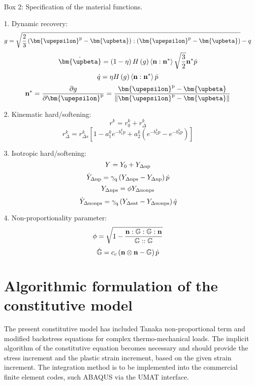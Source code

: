 \begin{framed}
\label{Box:1}
Box 2: Specification of the material functions.

1. Dynamic recovery:
\[g = \sqrt {\frac{2}{3}\left( {{{\bm{\upepsilon }}^{\rm{p}}} - {\bm{\upbeta}}} \right):\left( {{{\bm{\upepsilon }}^{\rm{p}}} - {\bm{\upbeta}}} \right)}  - q\]
\[{\dot{\bm{\upbeta}}}  = \left( {1 - \eta } \right)H\left( g \right)\left\langle {{\bf{n}}:{{\bf{n}}^*}} \right\rangle \sqrt {\frac{3}{2}} {{\bf{n}}^*}\dot p\]
\[\dot q = \eta H\left( g \right)\left\langle {{\bf{n}}:{{\bf{n}}^*}} \right\rangle \dot p\]
\[{{\bf{n}}^*} = \frac{{\partial g}}{{\partial {{\bm{\upepsilon }}^{\rm{p}}}}} = \frac{{{{\bm{\upepsilon }}^{\rm{p}}} - {\bm{\upbeta}}}}{{\left\| {{{\bm{\upepsilon }}^{\rm{p}}} - {\bm{\upbeta}}} \right\|}}\]

2. Kinematic hard/softening:
\[{r^k} = r_0^k + r_\Delta ^k\]
\[r_\Delta ^k = r_{\Delta s}^k\left[ {1 - a_1^k{e^{ - b_1^kp}} + a_2^k({e^{ - b_2^kp}} - {e^{ - b_3^kp}})} \right]\]

3. Isotropic hard/softening:
\[Y = {Y_0} + {Y_{\Delta \rm np}}\]
\[{\dot Y_{\Delta \rm np}} = {\gamma _{\rm q}}\left( {{Y_{\Delta \rm nps}} - {Y_{\Delta \rm np}}} \right)\dot p\]
\[{Y_{\Delta \rm nps}} = \phi {Y_{\Delta \rm nonps}}\]
\[{\dot Y_{\Delta \rm nonps}} = {\gamma _{\rm q}}\left( {{Y_{\Delta \rm sat}} - {Y_{\Delta \rm nonps}}} \right)\dot q\]


4. Non-proportionality parameter:
\[\phi  = \sqrt {1 - \frac{{{\bf{n}}:\mathbb{G}:\mathbb{G}:{\bf{n}}}}{{\mathbb{G}::\mathbb{G}}}} \]
\[\dot {\mathbb{G}} = {c_c}\left( {{\bf{n}} \otimes {\bf{n}} - \mathbb{G}} \right)\dot p\]

\end{framed}

\section{Algorithmic formulation of the constitutive model}
\noindent
The present constitutive model has included Tanaka non-proportional term and modified backstress equations for complex thermo-mechanical loads. The implicit algorithm of the constitutive equation becomes necessary and should provide the stress increment and the plastic strain increment, based on the given strain increment. The integration method is to be implemented into the commercial finite element codes, such ABAQUS via the UMAT interface.

